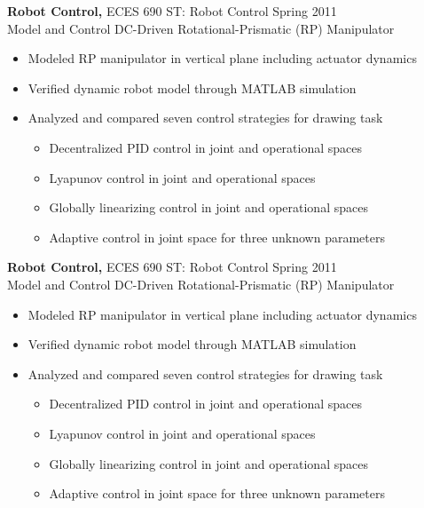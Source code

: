 \documentclass[margin]{res}
\begin{document}
\begin{resume}
\begin{tech}
\begin{controls}
{\bf Robot Control,} ECES 690 ST: Robot Control \hfill Spring 2011 \\
Model and Control DC-Driven Rotational-Prismatic (RP) Manipulator
\begin{itemize} \itemsep -2pt %
	\item Modeled RP manipulator in vertical plane including actuator dynamics
	\item Verified dynamic robot model through MATLAB simulation 
	\item Analyzed and compared seven control strategies for drawing task
		\vspace{-2mm}
		\begin{itemize} \itemsep -2pt %
		\item Decentralized PID control in joint and operational spaces
		\item Lyapunov control in joint and operational spaces
		\item Globally linearizing control in joint and operational spaces
		\item Adaptive control in joint space for three unknown parameters
		\end{itemize} \vspace{-2mm}
\end{itemize}
\end{controls}
\end{tech}
\begin{general}
{\bf Robot Control,} ECES 690 ST: Robot Control \hfill Spring 2011 \\
Model and Control DC-Driven Rotational-Prismatic (RP) Manipulator
\begin{itemize} \itemsep -2pt %
	\item Modeled RP manipulator in vertical plane including actuator dynamics
	\item Verified dynamic robot model through MATLAB simulation 
	\item Analyzed and compared seven control strategies for drawing task
		\vspace{-2mm}
		\begin{itemize} \itemsep -2pt %
		\item Decentralized PID control in joint and operational spaces
		\item Lyapunov control in joint and operational spaces
		\item Globally linearizing control in joint and operational spaces
		\item Adaptive control in joint space for three unknown parameters
		\end{itemize} \vspace{-2mm}
\end{itemize}
\end{general}


\end{resume}
\end{document}
